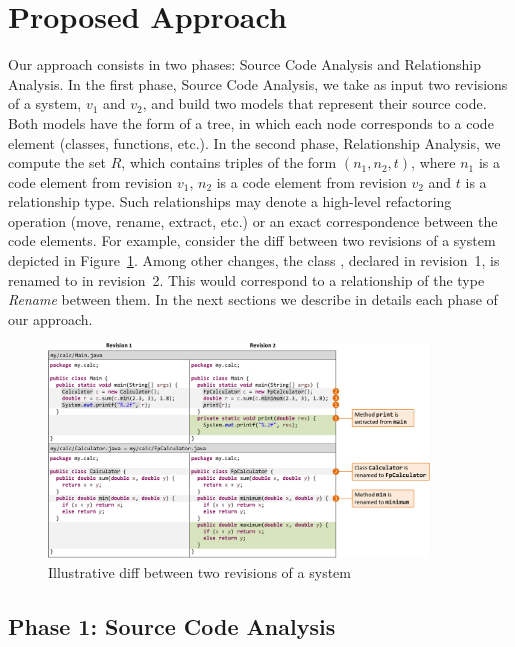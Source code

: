 \section{Proposed Approach}

Our approach consists in two phases: Source Code Analysis and Relationship Analysis.
In the first phase, Source Code Analysis, we take as input two revisions of a system, $v_1$ and $v_2$, and build two models that represent their source code.
Both models have the form of a tree, in which each node corresponds to a code element (classes, functions, etc.).
In the second phase, Relationship Analysis, we compute the set $R$, which contains triples of the form $(n_1, n_2, t)$, where $n_1$ is a code element from revision $v_1$, $n_2$ is a code element from revision $v_2$ and $t$ is a relationship type.
Such relationships may denote a high-level refactoring operation (move, rename, extract, etc.) or an exact correspondence between the code elements.
For example, consider the diff between two revisions of a system depicted in Figure~\ref{FigDiff1}.
Among other changes, the class , declared in revision~1, is renamed to  in revision~2. This would correspond to a relationship of the type \emph{Rename} between them.
In the next sections we describe in details each phase of our approach.

\begin{figure}[htb]
\centering
\includegraphics[width=0.9\textwidth]{img/diff1.pdf}
\caption{Illustrative diff between two revisions of a system}
\label{FigDiff1}
\end{figure}


\subsection{Phase 1: Source Code Analysis}

